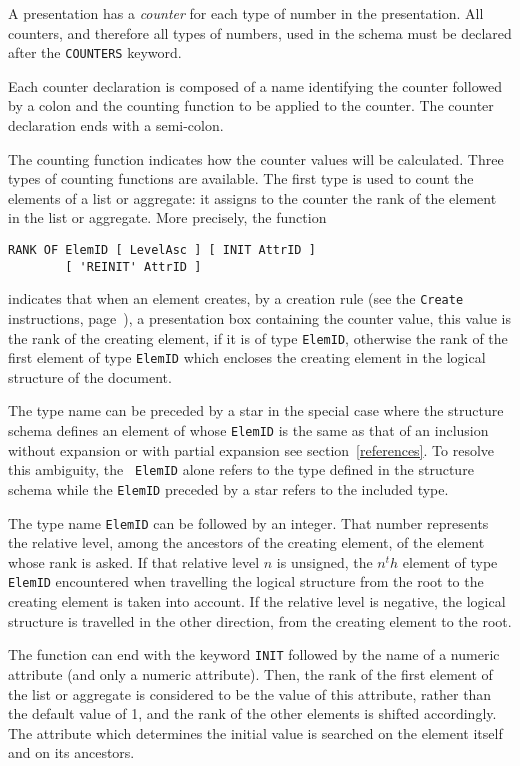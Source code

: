 A presentation has a {\em counter} for each type of number in the
presentation.  All counters, and therefore all types of numbers, used
in the schema must be declared after the {\tt COUNTERS} keyword.

Each counter declaration is composed of a name identifying the
counter followed by a colon and the counting function to be applied to
the counter.  The counter declaration ends with a semi-colon.

The counting function indicates how the counter values will be
calculated.  Three types of counting functions are available.  The first
type is used to count the elements of a list or aggregate: it assigns
to the counter the rank of the element in the list or aggregate.  More
precisely, the function 
\begin{verbatim}
RANK OF ElemID [ LevelAsc ] [ INIT AttrID ]
        [ 'REINIT' AttrID ]
\end{verbatim}
indicates that when an element creates, by a creation rule (see the
{\tt Create} instructions, page~\pageref{creation}), a presentation
box containing  the counter value, this value is the rank of the
creating element, if it is of type {\tt ElemID}, otherwise the rank of
the first element of type {\tt ElemID} which encloses the creating
element in the logical structure of the document.

The type name can be preceded by a star in the special case where the
structure schema defines an element of whose {\tt ElemID} is the same
as that of an inclusion without expansion or with partial expansion
see section~\ref{references}.  To resolve this ambiguity, the {\tt
ElemID} alone refers to the type defined in the structure schema while
the {\tt ElemID} preceded by a star refers to the included type.

The type name {\tt ElemID} can be followed by an integer.  That number
represents the relative level, among the ancestors of the creating element,
of the element whose rank is asked.  If that relative level $n$ is
unsigned, the $n^th$ element of type {\tt ElemID} encountered when
travelling the logical structure from the root to the creating element
is taken into account.  If the relative level is negative, the logical
structure is travelled in the other direction, from the creating element
to the root.

The function can end with the keyword {\tt INIT} followed by the name
of a numeric attribute (and only a numeric attribute).  Then, the rank
of the first element of the list or aggregate is considered to be the
value of this attribute, rather than the default value of 1, and the
rank of the other elements is shifted accordingly.  The attribute
which determines the initial value is searched on the element itself
and on its ancestors.

